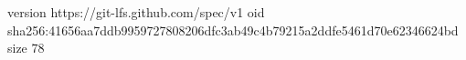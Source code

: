 version https://git-lfs.github.com/spec/v1
oid sha256:41656aa7ddb9959727808206dfc3ab49c4b79215a2ddfe5461d70e62346624bd
size 78
